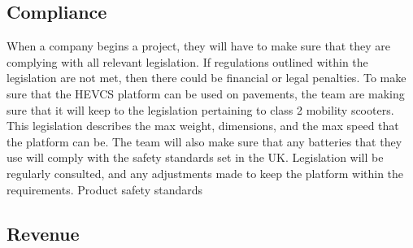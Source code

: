 \documentclass [12pt]{article}
\begin{document}
\subsection{Compliance}\label{sec:Compliance_Risk}

When a company begins a project, they will have to make sure that they are complying with all relevant legislation. If regulations outlined within the legislation are not met, then there could be financial or legal penalties. To make sure that the HEVCS platform can be used on pavements, the team are making sure that it will keep to the legislation pertaining to class 2 mobility scooters. This legislation describes the max weight, dimensions, and the max speed that the platform can be. The team will also make sure that any batteries that they use will comply with the safety standards set in the UK. Legislation will be regularly consulted, and any adjustments made to keep the platform within the requirements. Product safety standards

\subsection{Revenue}\label{sec:Revenue_Risk}
\end{document}

